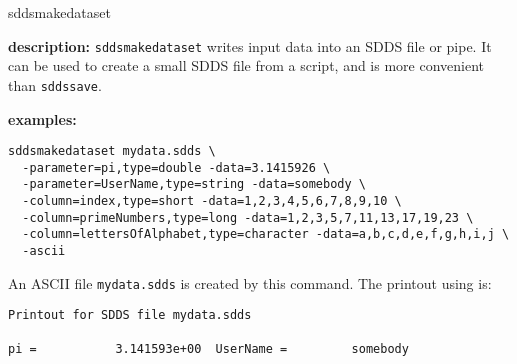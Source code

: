 \begin{sddsprog}{sddsmakedataset}
\item {\bf description:} \verb|sddsmakedataset| writes input data into an SDDS file or pipe. It can be used to create a small SDDS file from a script, and is more convenient than \verb|sddssave|.
\item {\bf examples:}
\begin{verbatim}
sddsmakedataset mydata.sdds \
  -parameter=pi,type=double -data=3.1415926 \
  -parameter=UserName,type=string -data=somebody \
  -column=index,type=short -data=1,2,3,4,5,6,7,8,9,10 \
  -column=primeNumbers,type=long -data=1,2,3,5,7,11,13,17,19,23 \
  -column=lettersOfAlphabet,type=character -data=a,b,c,d,e,f,g,h,i,j \
  -ascii
\end{verbatim}
An ASCII file \verb|mydata.sdds| is created by this command. The printout using  is:
\begin{verbatim}
Printout for SDDS file mydata.sdds

pi =           3.141593e+00  UserName =         somebody


\end{verbatim}
\end{sddsprog}
